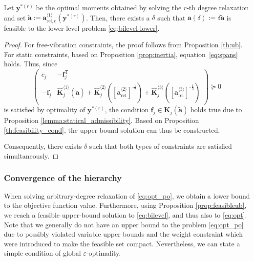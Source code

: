 \documentclass[final,onefignum,onetabnum]{siamart220329}
\newtheorem*{proof}{Proof}%
\begin{document}
\begin{proposition}\label{prop:feasibleub}
	Let $\mathbf{y}^{*(r)}$ be the optimal moments obtained by solving the $r$-th degree relaxation and set $\tilde{\mathbf{a}} := \mathbf{a}_{\mathrm{rel},e}^{\langle 1\rangle}(\mathbf{y}^{*(r)})$. Then, there exists a $\delta$ such that $\mathbf{a}(\delta):=\delta\tilde{\mathbf{a}}$ is feasible to the lower-level problem \eqref{eq:bilevel-lower}.
\end{proposition}
\begin{proof}
	For free-vibration constraints, the proof follows from Proposition \ref{th:ub}. For static constraints, based on Proposition \ref{prop:inertia}, equation~\eqref{eq:spans} holds. Thus, since
	\begin{equation}
		\begin{pmatrix}
			\overline{c}_j & -\mathbf{f}_j^\mathrm{T}\\
			-\mathbf{f}_j & \hat{\mathbf{K}}_j^{\langle 1\rangle}(\tilde{\mathbf{a}}) + \hat{\mathbf{K}}_j^{\langle 2\rangle}\left(\left[\mathbf{a}_{\mathrm{rel}}^{\langle 2\rangle}\right]^{\circ\frac{1}{2}}\right) + \hat{\mathbf{K}}_j^{\langle 3\rangle}\left(\left[\mathbf{a}_{\mathrm{rel}}^{\langle 3\rangle}\right]^{\circ\frac{1}{3}}\right)
		\end{pmatrix} \succeq 0
	\end{equation}
	is satisfied by optimality of $\mathbf{y}^{*(r)}$, the condition $\mathbf{f}_j \in \mathbf{K}_j(\mathbf{\tilde{a}})$ holds true due to Proposition \ref{lemma:statical_admissibility}. Based on Proposition \ref{th:feasibility_cond}, the upper bound solution can thus be constructed.
	
	Consequently, there exists $\delta$ such that both types of constraints are satisfied simultaneously.
\end{proof}

\subsubsection{Convergence of the hierarchy}

When solving {arbitrary-degree} relaxation of \eqref{eq:opt_po}, we obtain a lower bound to the objective function value. Furthermore, using Proposition \ref{prop:feasibleub}, we reach a feasible upper-bound solution to \eqref{eq:bilevel}, and thus also to \eqref{eq:opt}. Note that we generally do not have an upper bound to the problem \eqref{eq:opt_po} due to possibly violated variable upper bounds and the weight constraint which were introduced to make the feasible set compact. Nevertheless, we can state a simple condition of global $\varepsilon$-optimality.
\end{document}
